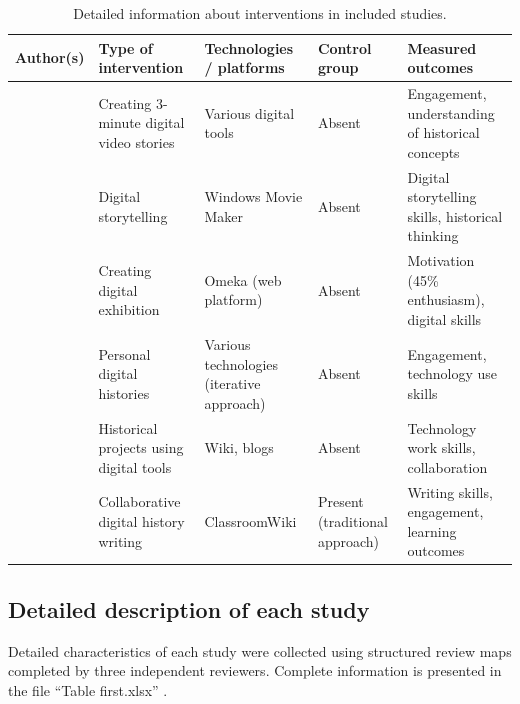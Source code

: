 \documentclass[
hf,
]{ceurart}
\begin{document}
\begin{table}[h]
\centering
\caption{Detailed information about interventions in included studies.}
\label{tab:intervention-details}
\begin{tabular}{|p{2cm}|p{4cm}|p{3cm}|p{2.5cm}|p{3cm}|}
\hline
\textbf{Author(s)} & \textbf{Type of intervention} & \textbf{Technologies / platforms} & \textbf{Control group} & \textbf{Measured outcomes} \\
\hline
\citet{Bell2016} & Creating 3-minute digital video stories & Various digital tools & Absent & Engagement, understanding of historical concepts \\
\hline
\citet{Coleborne2011} & Digital storytelling & Windows Movie Maker & Absent & Digital storytelling skills, historical thinking \\
\hline
\citet{Davis2017} & Creating digital exhibition & Omeka (web platform) & Absent & Motivation (45\% enthusiasm), digital skills \\
\hline
\citet{Lee2014159} & Personal digital histories & Various technologies (iterative approach) & Absent & Engagement, technology use skills \\
\hline
\citet{McLean20144} & Historical projects using digital tools & Wiki, blogs & Absent & Technology work skills, collaboration \\
\hline
\citet{Soh2013} & Collaborative digital history writing & ClassroomWiki & Present (traditional approach) & Writing skills, engagement, learning outcomes \\
\hline
\end{tabular}%
\end{table}

\subsection{Detailed description of each study}

Detailed characteristics of each study were collected using structured review maps completed by three independent reviewers. Complete information is presented in the file ``Table first.xlsx'' \cite{zenodo}. %

\end{document}

